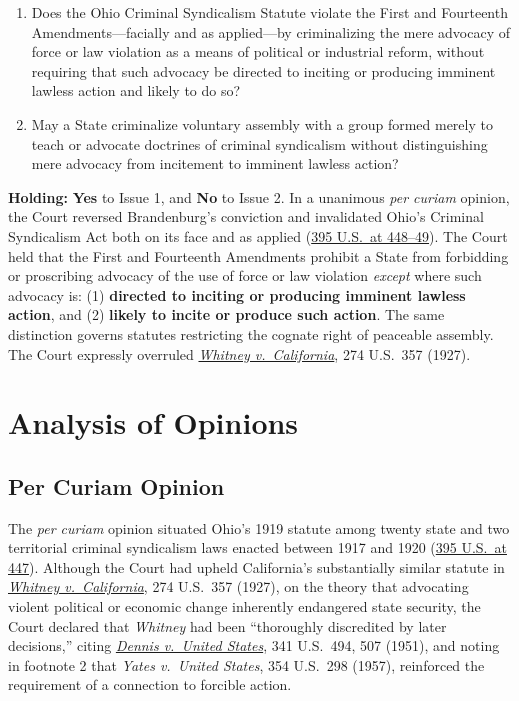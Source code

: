 \documentclass[12pt]{article}
\begin{document}
\begin{enumerate}
  \item Does the Ohio Criminal Syndicalism Statute violate the First and Fourteenth Amendments---facially and as applied---by criminalizing the mere advocacy of force or law violation as a means of political or industrial reform, without requiring that such advocacy be directed to inciting or producing imminent lawless action and likely to do so?
  \item May a State criminalize voluntary assembly with a group formed merely to teach or advocate doctrines of criminal syndicalism without distinguishing mere advocacy from incitement to imminent lawless action?
\end{enumerate}

\textbf{Holding:} \textbf{Yes} to Issue 1, and \textbf{No} to Issue 2. In a unanimous \emph{per curiam} opinion, the Court reversed Brandenburg's conviction and invalidated Ohio's Criminal Syndicalism Act both on its face and as applied (\href{https://supreme.justia.com/cases/federal/us/395/444/}{395 U.S.\ at 448--49}). The Court held that the First and Fourteenth Amendments prohibit a State from forbidding or proscribing advocacy of the use of force or law violation \emph{except} where such advocacy is: (1) \textbf{directed to inciting or producing imminent lawless action}, and (2) \textbf{likely to incite or produce such action}. The same distinction governs statutes restricting the cognate right of peaceable assembly. The Court expressly overruled \href{https://supreme.justia.com/cases/federal/us/274/357/}{\emph{Whitney v.\ California}}, 274 U.S.\ 357 (1927).

\section{Analysis of Opinions}
\subsection{Per Curiam Opinion}

The \emph{per curiam} opinion situated Ohio's 1919 statute among twenty state and two territorial criminal syndicalism laws enacted between 1917 and 1920 (\href{https://supreme.justia.com/cases/federal/us/395/444/}{395 U.S.\ at 447}). Although the Court had upheld California's substantially similar statute in \href{https://supreme.justia.com/cases/federal/us/274/357/}{\emph{Whitney v.\ California}}, 274 U.S.\ 357 (1927), on the theory that advocating violent political or economic change inherently endangered state security, the Court declared that \emph{Whitney} had been ``thoroughly discredited by later decisions,'' citing \href{https://supreme.justia.com/cases/federal/us/341/494/}{\emph{Dennis v.\ United States}}, 341 U.S.\ 494, 507 (1951), and noting in footnote 2 that \emph{Yates v.\ United States}, 354 U.S.\ 298 (1957), reinforced the requirement of a connection to forcible action.
\end{document}
